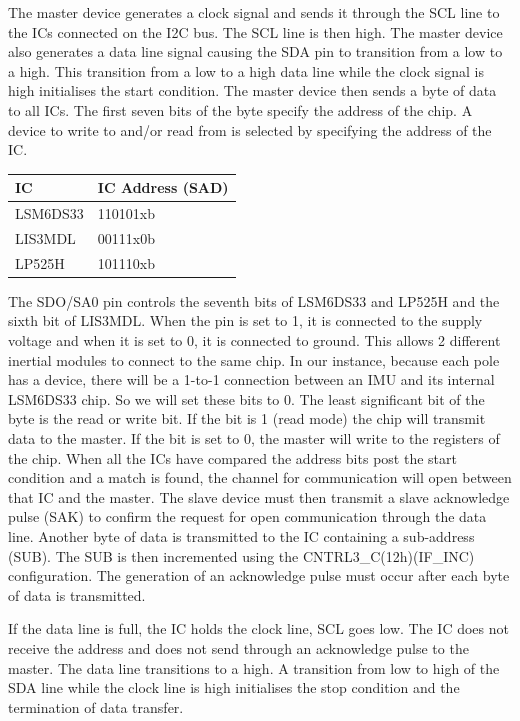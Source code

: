 \documentclass[12pt]{article}
\begin{document}
The master device generates a clock signal and sends it through the SCL line to the ICs connected on the I2C bus. The SCL
line is then high. The master device also generates a data line signal causing the SDA pin to transition from a low to a
high. This transition from a low to a high data line while the clock signal is high initialises the start condition. 
The master device then sends a byte of data to all ICs. The first seven bits of the byte specify the address of the 
chip. A device to write to and/or read from is selected by specifying the address of the IC. 

\begin{table}[]
  \begin{tabular}{|l|l|}
    \hline
  IC       & IC Address (SAD) \\\hline
  LSM6DS33 & 110101xb         \\\hline
  LIS3MDL  & 00111x0b         \\\hline
  LP525H   & 101110xb        \\ \hline
  \end{tabular}
\end{table}
The SDO/SA0 pin controls the seventh bits of LSM6DS33 and LP525H and the sixth bit of LIS3MDL. When the pin is set to 1,
it is connected to the supply voltage and when it is set to 0, it is connected to ground. This allows 2 different 
inertial modules to connect to the same chip. In our instance, because each pole has a device, there will be a 1-to-1
connection between an IMU and its internal LSM6DS33 chip. So we will set these bits to 0. The least significant bit of 
the byte is the read or write bit. If the bit is 1 (read mode) the chip will transmit data to the master. If the bit is 
set to 0, the master will write to the registers of the chip. 
When all the ICs have compared the address bits post the start condition and a match is found, the channel for 
communication will open between that IC and the master. The slave device must then transmit a slave acknowledge pulse 
(SAK) to confirm the request for open communication through the data line. 
Another byte of data is transmitted to the IC containing a sub-address (SUB). The SUB is then incremented using the
CNTRL3\_C(12h)(IF\_INC) configuration. The generation of an acknowledge pulse must occur after each byte of data is
transmitted.

If the data line is full, the IC holds the clock line, SCL goes low. The IC does not receive the address and does not
send through an acknowledge pulse to the master. The data line transitions to a high. A transition from low to high of 
the SDA line while the clock line is high initialises the stop condition and the termination of data transfer. 
\end{document}
